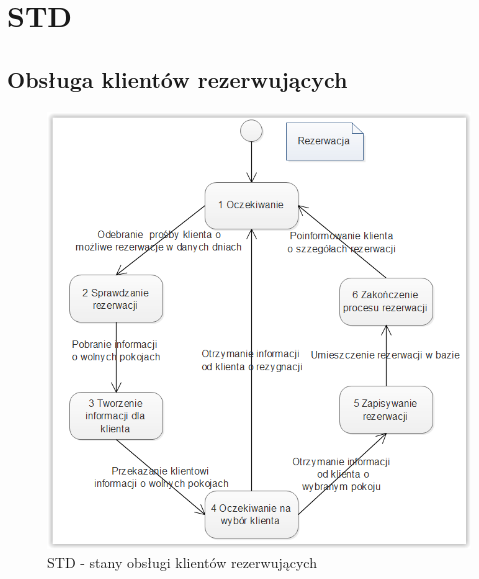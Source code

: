 \documentclass[a4paper, 11pt]{article}
\begin{document}
	
	
	\section{STD}
	\indent
	\subsection{Obsługa klientów rezerwujących}
	\indent
	\begin{figure}[H]%
			\includegraphics[scale=0.9]{Img/STD-rezerwacja.png}
			\caption{STD - stany obsługi klientów rezerwujących}
	\end{figure} 
\end{document}
